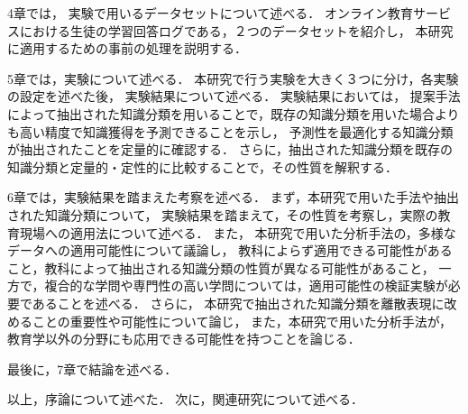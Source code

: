 4章では，
実験で用いるデータセットについて述べる．
オンライン教育サービスにおける生徒の学習回答ログである，２つのデータセットを紹介し，
本研究に適用するための事前の処理を説明する．

\vvspace

5章では，実験について述べる．
本研究で行う実験を大きく３つに分け，各実験の設定を述べた後，
実験結果について述べる．
実験結果においては，
提案手法によって抽出された知識分類を用いることで，既存の知識分類を用いた場合よりも高い精度で知識獲得を予測できることを示し，
予測性を最適化する知識分類が抽出されたことを定量的に確認する．
さらに，抽出された知識分類を既存の知識分類と定量的・定性的に比較することで，その性質を解釈する．

\vvspace

6章では，実験結果を踏まえた考察を述べる．
まず，本研究で用いた手法や抽出された知識分類について，
実験結果を踏まえて，その性質を考察し，実際の教育現場への適用法について述べる．
また，
本研究で用いた分析手法の，多様なデータへの適用可能性について議論し，
教科によらず適用できる可能性があること，教科によって抽出される知識分類の性質が異なる可能性があること，
一方で，複合的な学問や専門性の高い学問については，適用可能性の検証実験が必要であることを述べる．
さらに，
本研究で抽出された知識分類を離散表現に改めることの重要性や可能性について論じ，
また，本研究で用いた分析手法が，教育学以外の分野にも応用できる可能性を持つことを論じる．

\vvspace

最後に，7章で結論を述べる．



\vvspace
以上，序論について述べた．
次に，関連研究について述べる．


